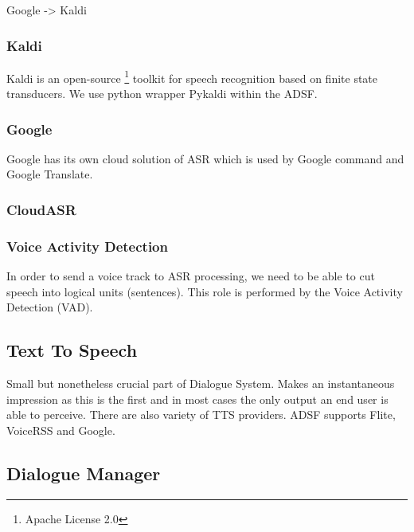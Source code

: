 Google -> Kaldi


\subsubsection{Kaldi}

Kaldi is an open-source \footnote{Apache License 2.0} toolkit for speech recognition based on finite state transducers.
We use python wrapper Pykaldi within the ADSF.


\subsubsection{Google}

Google has its own cloud solution of ASR which is used by Google command and Google Translate.


\subsubsection{CloudASR}


\subsubsection{Voice Activity Detection}

In order to send a voice track to ASR processing, we need to be able to cut speech into logical units (sentences).
This role is performed by the Voice Activity Detection (VAD).

\subsection{Text To Speech}

Small but nonetheless crucial part of Dialogue System.
Makes an instantaneous impression as this is the first and in most cases the only output an end user is able to perceive. %
There are also variety of TTS providers. ADSF supports Flite, VoiceRSS and Google.

\subsection{Dialogue Manager}

